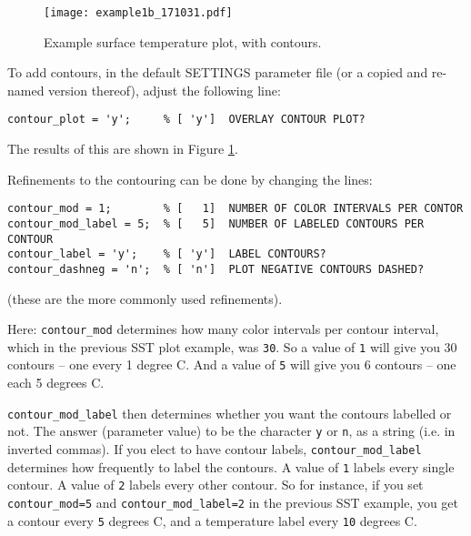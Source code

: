 \documentclass[11pt,fleqn]{book} %
\begin{document}
\begin{enumerate}[noitemsep]
\begin{figure}[ht]
\begin{center}
\texttt{[image: example1b\_171031.pdf]}
\end{center}
\vspace{-4mm}
\caption{Example surface temperature plot, with contours.}
\label{fig:example1b}
\end{figure}

\vspace{4pt}
To add contours, in the default \footnotesize\textsf{SETTINGS }\normalsize parameter file (or a copied and re-named version thereof), adjust the following line:
\small
\vspace{-2pt}\begin{verbatim}
contour_plot = 'y';     % [ 'y']  OVERLAY CONTOUR PLOT?
\end{verbatim}\vspace{-2pt}
\normalsize
The results of this are shown in Figure \ref{fig:example1b}.

\pagebreak 

Refinements to the contouring can be done by changing the lines:
\small
\vspace{-2pt}\begin{verbatim}
contour_mod = 1;        % [   1]  NUMBER OF COLOR INTERVALS PER CONTOR
contour_mod_label = 5;  % [   5]  NUMBER OF LABELED CONTOURS PER CONTOUR
contour_label = 'y';    % [ 'y']  LABEL CONTOURS?
contour_dashneg = 'n';  % [ 'n']  PLOT NEGATIVE CONTOURS DASHED?
\end{verbatim}\vspace{-2pt}
\normalsize
(these are the more commonly used refinements).

Here: \texttt{contour\_mod} determines how many color intervals per contour interval, which in the previous SST plot example, was \texttt{30}. So a value of \texttt{1} will give you 30 contours -- one every 1 degree C. And a value of \texttt{5} will give you 6 contours -- one each 5 degrees C.

\texttt{contour\_mod\_label} then determines whether you want the contours labelled or not. The answer (parameter value) to be the character \texttt{y} or \texttt{n}, as a string (i.e. in inverted commas). If you elect to have contour labels, \texttt{contour\_mod\_label} determines how frequently to label the contours. A value of \texttt{1} labels every single contour. A value of \texttt{2} labels every other contour. So for instance, if you set \texttt{contour\_mod=5} and \texttt{contour\_mod\_label=2} in the previous SST example, you get a contour every \texttt{5} degrees C, and a temperature label every \texttt{10} degrees C.


\end{enumerate}
\end{document}
